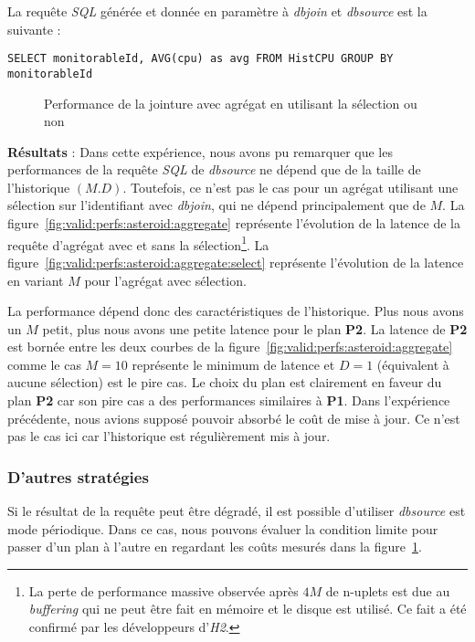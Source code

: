 La requête \textit{SQL} générée et donnée en paramètre à \textit{dbjoin} et \textit{dbsource} est la suivante : 
\begin{lstlisting}
SELECT monitorableId, AVG(cpu) as avg FROM HistCPU GROUP BY monitorableId
\end{lstlisting}

\begin{figure}[ht]
\caption{Performance de la jointure avec agrégat en utilisant la sélection ou non}\label{fig:valid:perfs:asteroid:agg}
\end{figure}

\textbf{Résultats} : Dans cette expérience, nous avons pu remarquer que les performances de la requête \textit{SQL} de \textit{dbsource} ne dépend que de la taille de l'historique $(M.D)$. Toutefois, ce n'est pas le cas pour un agrégat utilisant une sélection sur l'identifiant avec \textit{dbjoin}, qui ne dépend principalement que de $M$. La figure~\ref{fig:valid:perfs:asteroid:aggregate} représente l'évolution de la latence de la requête d'agrégat avec et sans la sélection\footnote{La perte de performance massive observée après $4M$ de n-uplets est due au \textit{buffering} qui ne peut être fait en mémoire et le disque est utilisé. Ce fait a été confirmé par les développeurs d'\textit{H2}.}. La figure~\ref{fig:valid:perfs:asteroid:aggregate:select} représente l'évolution de la latence en variant $M$ pour l'agrégat avec sélection.

La performance dépend donc des caractéristiques de l'historique. Plus nous avons un $M$ petit, plus nous avons une petite latence pour le plan \textbf{P2}. La latence de \textbf{P2} est bornée entre les deux courbes de la figure~\ref{fig:valid:perfs:asteroid:aggregate} comme le cas $M=10$ représente le minimum de latence et $D=1$ (équivalent à aucune sélection) est le pire cas. Le choix du plan est clairement en faveur du plan \textbf{P2} car son pire cas a des performances similaires à \textbf{P1}. Dans l'expérience précédente, nous avions supposé pouvoir absorbé le coût de mise à jour. Ce n'est pas le cas ici car l'historique est régulièrement mis à jour.

\subsubsection{D'autres stratégies}
Si le résultat de la requête peut être dégradé, il est possible d'utiliser \textit{dbsource} est mode périodique. Dans ce cas, nous pouvons évaluer la condition limite pour passer d'un plan à l'autre en regardant les coûts mesurés dans la figure~\ref{fig:valid:perfs:asteroid:agg}.

